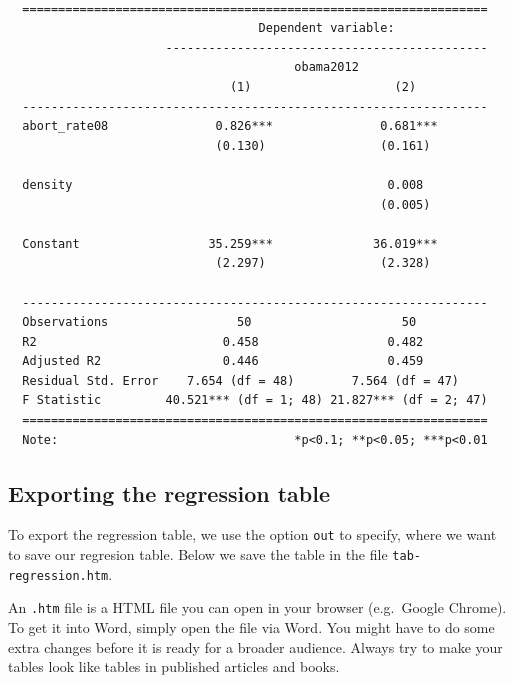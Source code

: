 \documentclass[12pt,oneside]{reedthesis}
\theoremstyle{definition}
\theoremstyle{definition}
\theoremstyle{definition}
\theoremstyle{remark}
\begin{document}
  \begin{verbatim}
  
  =================================================================
                                   Dependent variable:             
                      ---------------------------------------------
                                        obama2012                  
                               (1)                    (2)          
  -----------------------------------------------------------------
  abort_rate08               0.826***               0.681***       
                             (0.130)                (0.161)        
                                                                   
  density                                            0.008         
                                                    (0.005)        
                                                                   
  Constant                  35.259***              36.019***       
                             (2.297)                (2.328)        
                                                                   
  -----------------------------------------------------------------
  Observations                  50                     50          
  R2                          0.458                  0.482         
  Adjusted R2                 0.446                  0.459         
  Residual Std. Error    7.654 (df = 48)        7.564 (df = 47)    
  F Statistic         40.521*** (df = 1; 48) 21.827*** (df = 2; 47)
  =================================================================
  Note:                                 *p<0.1; **p<0.05; ***p<0.01
  \end{verbatim}
  \subsection{Exporting the regression
  table}\label{exporting-the-regression-table}
  
  To export the regression table, we use the option \texttt{out} to
  specify, where we want to save our regresion table. Below we save the
  table in the file \texttt{tab-regression.htm}.
  \begin{Shaded}
  \begin{Highlighting}[]
   \NormalTok{,}
            \NormalTok{)}
  \end{Highlighting}
  \end{Shaded}
  An \texttt{.htm} file is a HTML file you can open in your browser
  (e.g.~Google Chrome). To get it into Word, simply open the file via
  Word. You might have to do some extra changes before it is ready for a
  broader audience. Always try to make your tables look like tables in
  published articles and books.
  
\end{document}
